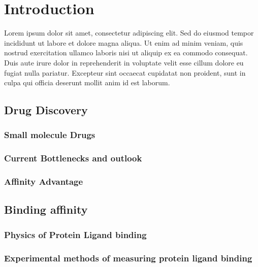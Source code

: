 \chapter{Introduction}
Lorem ipsum dolor sit amet, consectetur adipiscing elit. Sed do eiusmod tempor incididunt ut labore et dolore magna aliqua. Ut enim ad minim veniam, quis nostrud exercitation ullamco laboris nisi ut aliquip ex ea commodo consequat. Duis aute irure dolor in reprehenderit in voluptate velit esse cillum dolore eu fugiat nulla pariatur. Excepteur sint occaecat cupidatat non proident, sunt in culpa qui officia deserunt mollit anim id est laborum.

\label{introduction}

\section{Drug Discovery}

\lipsum[1][1-3]

\subsection{Small molecule Drugs}

\lipsum[1][1-3]

\subsection{Current Bottlenecks and outlook}

\lipsum[1][1-3]

\subsection{Affinity Advantage}

\lipsum[1][1-3]

\section{Binding affinity}

\lipsum[1][1-3]

\subsection{Physics of Protein Ligand binding}

\lipsum[1][1-3]

\subsection{Experimental methods of measuring protein ligand binding}

